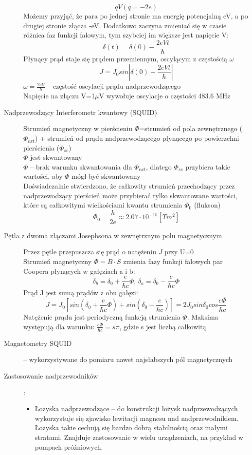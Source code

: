 \documentclass[a4paper,11pt]{article}
\begin{document}
\begin{description}
  $$qV(q=-2e)$$
  Możemy przyjąć, że para po jednej stronie ma energię potencjalną eV, a po drugiej stronie złącza -eV. Dodatkowo zaczyna zmieniać się w czasie różnica faz funkcji falowym, tym szybciej im większe jest napięcie V:
  $$\delta(t)=\delta(0)-\frac{2eVt}{\hbar}$$
  Płynący prąd staje się prądem przemiennym, oscylącym z częstością $\omega$
  $$J=J_0sin|\delta(0)-\frac{2eVt}{\hbar}|$$
  $\omega = \frac{2eV}{\hbar}$ -- częstość oscylacji prądu nadprzewodzącego\\
  Napięcie na złączu V=1$\mu$V wywołuje oscylacje o częstości 483.6 MHz
\item[Nadprzewodzący Interferometr kwantowy (SQUID)] Strumień magnetyczny w pierścieniu $\Phi$=strumień od pola zewnętrznego ($\Phi_{ext}$) + strumień od prądu nadprzewodzącego płynącego po powierzchni pierścienia ($\Phi_{sc}$)\\
  $\Phi$ jest skwantowany\\
  $\Phi$ -- brak warunku skwantowania dla $\Phi_{ext}$, dlatego $\Phi_{sc}$ przybiera takie wartości, aby $\Phi$ mógł być skwantowany\\
  Doświadczalnie stwierdzono, że całkowity strumień przechodzący przez nadprzewodzący pierścień może przybierać tylko skwantowane wartości, które są całkowitymi wielkościami kwantu strumienia $\Phi_0$ (flukson)
$$\Phi_0 = \frac{h}{2e}\approx 2.07\cdot10^{-15}[Tm^2]$$
\item[Pętla z dwoma złączami Josephsona w zewnętrznym polu magnetycznym] Przez pętle przepuszcza się prąd o natężeniu $J$ przy U=0\\
  Strumień magnetyczny $\Phi=B\cdot S$ zmienia fazy funkcji falowych par Coopera płynących w gałęziach a i b:
  $$\delta_b=\delta_0+\frac{e}{\hbar c}\Phi\text{,    }\delta_a = \delta_0-\frac{e}{\hbar c}\Phi$$
  Prąd J jest sumą prądów z obu gałęzi:
  $$J=J_0\left[sin\left(\delta_0+\frac{e}{\hbar c}\Phi\right) + sin\left(\delta_0-\frac{e}{\hbar c}\right)\right] = 2J_0sin\delta_0cos\frac{e\Phi}{\hbar c} $$
  Natężenie prądu jest periodyczną funkcją strumienia $\Phi$. Maksima występują dla warunku: $\frac{e\Phi}{\hbar c}=s\pi$, gdzie s jest liczbą całkowitą
\item[Magnetometry SQUID] -- wykorzystywane do pomiaru nawet najsłabszych pól magnetycznych
\item[Zastosowanie nadprzewodników]:
  \begin{itemize}
  \item Łożyska nadprzewodzące -- do konstrukcji łożysk nadprzewodzących wykorzystuje się zjawisko lewitacji magnesu nad nadprzewodnikiem. Łożyska takie cechują się bardzo dobrą stabilnością oraz małymi stratami. Znajduje zastosowanie w wielu urządzeniach, na przykład w pompach próżniowych.

\end{itemize}
\end{description}
\end{document}
